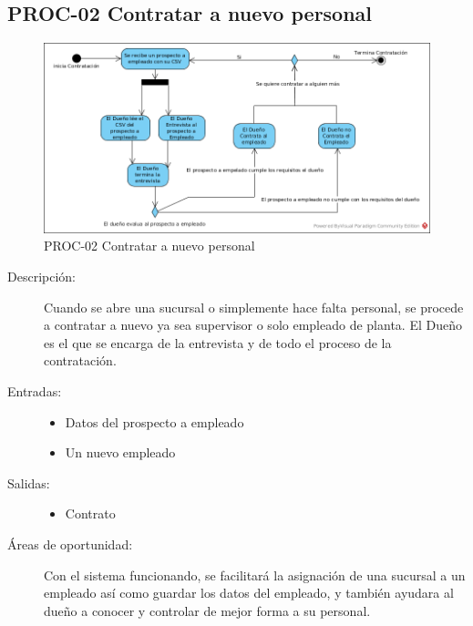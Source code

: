 \subsection{PROC-02 Contratar a nuevo personal}

\begin{figure}[htbp]
	\begin{center}
		\includegraphics[width=.8\textwidth]{images/AS-toprocContratacion}
		\caption{PROC-02 Contratar a nuevo personal}
		\label{fig:proceso2}
	\end{center}
\end{figure}

\begin{description}
	\item[Descripción:] Cuando se abre una sucursal o simplemente hace falta personal, se procede a contratar a nuevo ya sea supervisor o solo empleado de planta. El Dueño es el que se encarga de la entrevista y de todo el proceso de la contratación.
	\item[Entradas:] \cdtEmpty
        \begin{itemize}
			\item Datos del prospecto a empleado
			\item Un nuevo empleado
        \end{itemize}
	\item[Salidas:] \cdtEmpty
        \begin{itemize}
			\item Contrato
        \end{itemize}	
    \item[Áreas de oportunidad:] Con el sistema funcionando, se facilitará la asignación de una sucursal a un empleado así como guardar los datos del empleado, y también ayudara al dueño a conocer y controlar de mejor forma a su personal.
\end{description}

